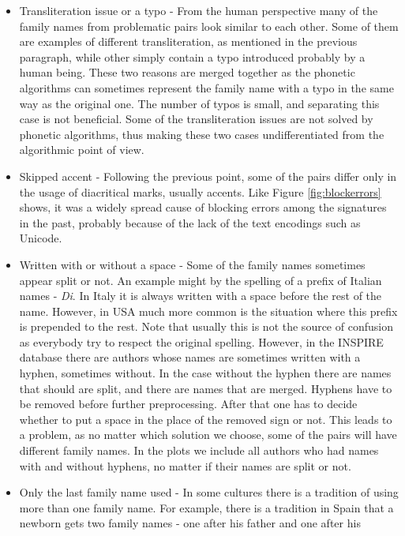 \documentclass{pracamgr}
\begin{document}
\begin{itemize}
    \item Transliteration issue or a typo - From the human perspective many of the
    family names from problematic pairs look similar to each other. Some of them are
    examples of different transliteration, as mentioned in the previous paragraph,
    while other simply contain a typo introduced probably by a human being. These
    two reasons are merged together as the phonetic algorithms can sometimes 
    represent the family name with a typo in the same way as the original one.
    The number of typos is small, and separating this case is not beneficial.
    Some of the transliteration issues are not solved by phonetic algorithms, thus
    making these two cases undifferentiated from the algorithmic point of view.
    \item Skipped accent - Following the previous point, some of the pairs differ
    only in the usage of diacritical marks, usually accents. Like Figure
    \ref{fig:blockerrors} shows, it was a widely spread cause of blocking errors
    among the signatures in the past, probably because of the lack of the text 
    encodings such as Unicode.
    \item Written with or without a space - Some of the family names sometimes appear
    split or not. An example might by the spelling of a prefix of Italian names -
    \textit{Di}. In Italy it is always written with a space before the rest of the
    name. However, in USA much more common is the situation where this prefix is
    prepended to the rest. Note that usually this is not the source of confusion
    as everybody try to respect the original spelling. However, in the INSPIRE database
    there are authors whose names are sometimes written with a hyphen, sometimes
    without. In the case without the hyphen there are names that should are split,
    and there are names that are merged. Hyphens have to be removed before further
    preprocessing. After that one has to decide whether to put a space in the place
    of the removed sign or not. This leads to a problem, as no matter which solution
    we choose, some of the pairs will have different family names. In the plots
    we include all authors who had names with and without hyphens, no matter if their
    names are split or not.
    \item Only the last family name used - In some cultures there is a tradition
    of using more than one family name. For example, there is a tradition in Spain
    that a newborn gets two family names - one after his father and one after his

\end{itemize}
\end{document}
